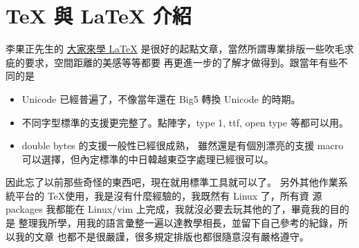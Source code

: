 \chapter{{\TeX} 與 {\LaTeX} 介紹}
李果正先生的
\href{https://github.com/TeXtw/LaTeX123/releases/download/v1.0/latex123.pdf}
{大家來學 \LaTeX}
是很好的起點文章，當然所謂專業排版一些吹毛求疵的要求，空間距離的美感等等都要
再更進一步的了解才做得到。跟當年有些不同的是
\begin{itemize}
\item Unicode 已經普遍了，不像當年還在 Big5 轉換 Unicode 的時期。
\item 不同字型標準的支援更完整了。點陣字，type 1, ttf, open type 等都可以用。
\item double bytes 的支援一般性已經很成熟， 雖然還是有個別漂亮的支援%
macro 可以選擇，但內定標準的中日韓越東亞字處理已經很可以。
\end{itemize}
因此忘了以前那些奇怪的東西吧，現在就用標準工具就可以了。
另外其他作業系統平台的 \TeX 使用，我是沒有什麼經驗的，我既然有 Linux 了，所有資
源 packages 我都能在 Linux/vim 上完成，我就沒必要去玩其他的了，畢竟我的目的是
整理我所學，用我的語言彙整一遍以達教學相長，並留下自己參考的紀錄，所以我的文章
也都不是很嚴謹，很多規定排版也都很隨意沒有嚴格遵守。
